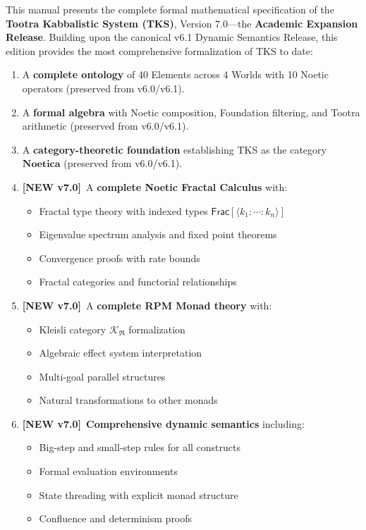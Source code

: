 \documentclass[11pt,twoside,openright]{book}
\theoremstyle{definition}
\theoremstyle{plain}
\theoremstyle{remark}
\newcommand{\Noetica}{\mathbf{Noetica}}
\newcommand{\RPM}{\mathfrak{R}}
\newcommand{\Kleisli}{\mathcal{K}}
\newcommand{\vnew}{\textcolor{blue!70!black}{\textbf{[NEW v7.0]}}}
\begin{document}
This manual presents the complete formal mathematical specification of the \textbf{Tootra Kabbalistic System (TKS)}, Version 7.0---the \textbf{Academic Expansion Release}. Building upon the canonical v6.1 Dynamic Semantics Release, this edition provides the most comprehensive formalization of TKS to date:

\begin{enumerate}[label=(\arabic*)]
  \item A \textbf{complete ontology} of 40 Elements across 4 Worlds with 10 Noetic operators (preserved from v6.0/v6.1).

  \item A \textbf{formal algebra} with Noetic composition, Foundation filtering, and Tootra arithmetic (preserved from v6.0/v6.1).

  \item A \textbf{category-theoretic foundation} establishing TKS as the category $\Noetica$ (preserved from v6.0/v6.1).

  \item \vnew\ A \textbf{complete Noetic Fractal Calculus} with:
    \begin{itemize}
      \item Fractal type theory with indexed types $\mathsf{Frac}[\langle k_1:\cdots:k_n \rangle]$
      \item Eigenvalue spectrum analysis and fixed point theorems
      \item Convergence proofs with rate bounds
      \item Fractal categories and functorial relationships
    \end{itemize}

  \item \vnew\ A \textbf{complete RPM Monad theory} with:
    \begin{itemize}
      \item Kleisli category $\Kleisli_\RPM$ formalization
      \item Algebraic effect system interpretation
      \item Multi-goal parallel structures
      \item Natural transformations to other monads
    \end{itemize}

  \item \vnew\ \textbf{Comprehensive dynamic semantics} including:
    \begin{itemize}
      \item Big-step and small-step rules for all constructs
      \item Formal evaluation environments
      \item State threading with explicit monad structure
      \item Confluence and determinism proofs
    \end{itemize}


\end{enumerate}
\end{document}
